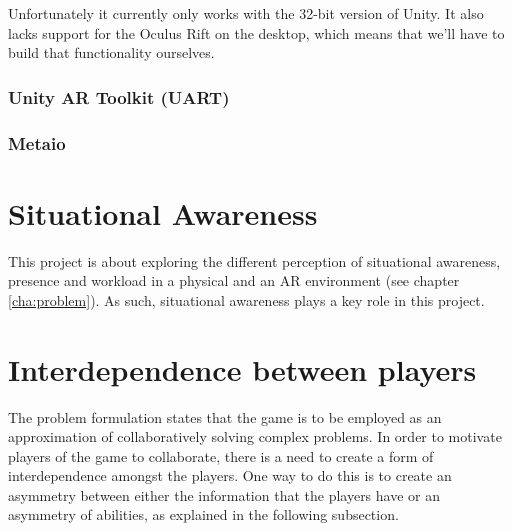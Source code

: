 				Unfortunately it currently only works with the 32-bit version of
				Unity. It also lacks support for the Oculus Rift on the desktop,
				which means that we'll have to build that functionality ourselves.

			\subsubsection{Unity AR Toolkit (UART)} \label{sssec:uart}


			\subsubsection{Metaio} \label{sssec:metaio}
	
	
	\section{Situational Awareness} \label{sec:awareness}
		This project is about exploring the different perception of situational 
		awareness, presence and workload in a physical and an AR environment 
		(see chapter \ref{cha:problem}). As such, situational awareness plays a 
		key role in this project.
		
	
	\section{Interdependence between players} \label{sec:interdependence}
		The problem formulation states that the game is to be employed as an 
		approximation of collaboratively solving complex problems. In order to
		motivate players of the game to collaborate, there is a need to create
		a form of interdependence amongst the players. One way to do this is to 
		create an asymmetry between either the information that the players have or
		an asymmetry of abilities, as explained in the following subsection. 
